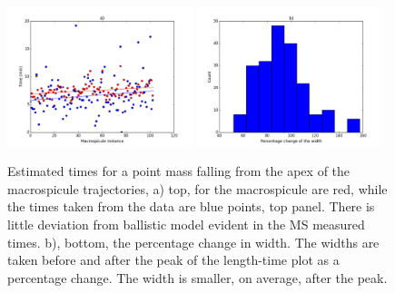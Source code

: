 \begin{figure}[h!]
	\centering
	\includegraphics[width=0.48\textwidth]{Chapter3/Figs/times_falling.pdf}
	\includegraphics[width=0.48\textwidth]{Chapter3/Figs/width_percent.pdf}
	
	\caption{\small Estimated times for a point mass falling from the apex of the macrospicule trajectories, a) top, for the macrospicule are red, while the times taken from the data are blue points, top panel. There is little deviation from ballistic model evident in the MS measured times. b), bottom, the percentage change in width. The widths are taken before and after the peak of the length-time plot as a percentage change. The width is smaller, on average, after the peak.}
	\label{fig:ballistics}
\end{figure}


